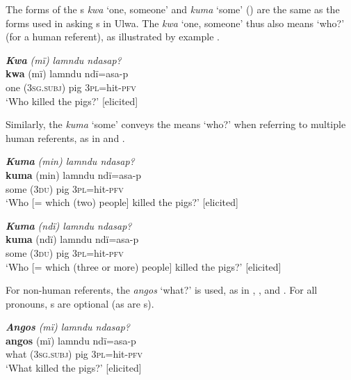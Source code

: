 
The forms of the s \textit{kwa} ‘one, someone’ and \textit{kuma} ‘some’ () are the same as the forms used in asking s in Ulwa. The  \textit{kwa} ‘one, someone’ thus also means ‘who?’ (for a  human referent), as illustrated by example .

\ea%
    \label{ex:pron:51}
          \textbf{\textit{Kwa}} \textit{(mï) lamndu ndasap?}\\
\gll \textbf{kwa}  (mï)    lamndu  ndï=asa-p\\
    one    (3\textsc{sg.subj)}  pig      \textsc{3pl=}hit-\textsc{pfv}\\
\glt `Who killed the pigs?’ [elicited]
\z

Similarly, the  \textit{kuma} ‘some’ conveys the means ‘who?’ when referring to 
 multiple human referents, as in  and .

\ea%
    \label{ex:pron:52}
          \textbf{\textit{Kuma}} \textit{(min) lamndu ndasap?}\\
\gll \textbf{kuma}  (min)  lamndu  ndï=asa-p\\
    some  (3\textsc{du)}  pig      \textsc{3pl=}hit-\textsc{pfv}\\
\glt `Who [= which (two) people] killed the pigs?’ [elicited]
\z

\newpage

\ea%
    \label{ex:pron:53}
          \textbf{\textit{Kuma}} \textit{(ndï) lamndu ndasap?}\\
\gll \textbf{kuma}  (ndï)  lamndu  ndï=asa-p\\
    some  (3\textsc{du)}  pig      \textsc{3pl=}hit-\textsc{pfv}\\
\glt `Who [= which (three or more) people] killed the pigs?’ [elicited]
\z
 
For non-human referents, the  \textit{angos} ‘what?’ is used, as in , , and . For all  pronouns, s are optional (as are s).

\ea%
    \label{ex:pron:54}
          \textbf{\textit{Angos}} \textit{(mï) lamndu ndasap?}\\
\gll \textbf{angos}  (mï)    lamndu  ndï=asa-p\\
    what  (3\textsc{sg.subj)}  pig      \textsc{3pl=}hit-\textsc{pfv}\\
\glt `What killed the pigs?’ [elicited]
\z

